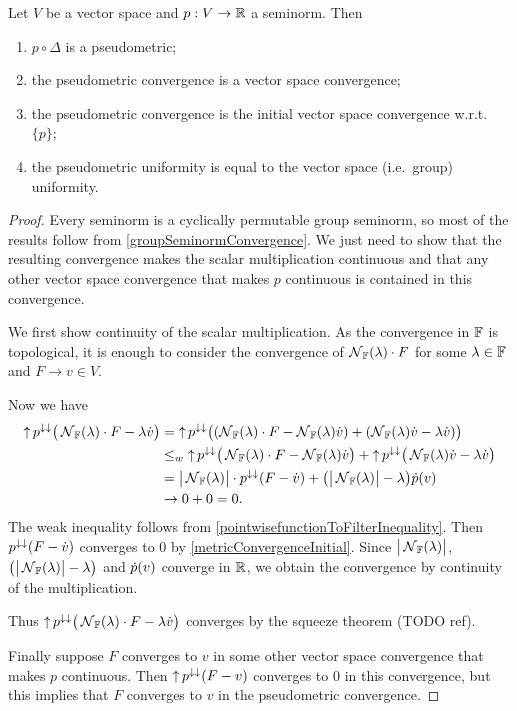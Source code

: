 \begin{lemma}
Let $V$ be a vector space and $p:V\to \mathbb{R}$ a seminorm. Then
\begin{enumerate}
\item $p\circ \Delta$ is a pseudometric;
\item the pseudometric convergence is a vector space convergence;
\item the pseudometric convergence is the initial vector space convergence w.r.t. $\{p\}$;
\item the pseudometric uniformity is equal to the vector space (i.e.\ group) uniformity.
\end{enumerate}
\end{lemma}
\begin{proof}
Every seminorm is a cyclically permutable group seminorm, so most of the results follow from \ref{groupSeminormConvergence}. We just need to show that the resulting convergence makes the scalar multiplication continuous and that any other vector space convergence that makes $p$ continuous is contained in this convergence.

We first show continuity of the scalar multiplication. As the convergence in $\mathbb{F}$ is topological, it is enough to consider the convergence of $\operatorname{\mathcal{N}}_{\mathbb{F}}(\lambda)\cdot F$ for some $\lambda \in \mathbb{F}$ and $F\to v\in V$. 

Now we have
\begin{align*}
\operatorname{\uparrow} p^{\downarrow\downarrow}\big(\operatorname{\mathcal{N}}_{\mathbb{F}}(\lambda)\cdot F - \lambda \dot{v}\big) &= \operatorname{\uparrow} p^{\downarrow\downarrow}\big((\operatorname{\mathcal{N}}_{\mathbb{F}}(\lambda)\cdot F - \operatorname{\mathcal{N}}_{\mathbb{F}}(\lambda)\dot{v}) + (\operatorname{\mathcal{N}}_{\mathbb{F}}(\lambda)\dot{v} -\lambda \dot{v})\big) \\
&\leq_w \operatorname{\uparrow} p^{\downarrow\downarrow}\big(\operatorname{\mathcal{N}}_{\mathbb{F}}(\lambda)\cdot F - \operatorname{\mathcal{N}}_{\mathbb{F}}(\lambda)\dot{v}\big) + \operatorname{\uparrow} p^{\downarrow\downarrow}\big(\operatorname{\mathcal{N}}_{\mathbb{F}}(\lambda)\dot{v} -\lambda \dot{v}\big) \\
&= \big|\operatorname{\mathcal{N}}_{\mathbb{F}}(\lambda)\big|\cdot p^{\downarrow\downarrow}(F-\dot{v}) + \big(\big|\operatorname{\mathcal{N}}_{\mathbb{F}}(\lambda)\big| - \lambda\big)\dot{p}(v) \\
&\to 0 + 0 = 0.
\end{align*}
The weak inequality follows from \ref{pointwisefunctionToFilterInequality}. Then $p^{\downarrow\downarrow}(F-\dot{v})$ converges to $0$ by \ref{metricConvergenceInitial}.
Since $\big|\operatorname{\mathcal{N}}_{\mathbb{F}}(\lambda)\big|$, $\big(\big|\operatorname{\mathcal{N}}_{\mathbb{F}}(\lambda)\big| - \lambda\big)$ and $\dot{p}(v)$ converge in $\mathbb{R}$, we obtain the convergence by continuity of the multiplication.

Thus $\operatorname{\uparrow} p^{\downarrow\downarrow}\big(\operatorname{\mathcal{N}}_{\mathbb{F}}(\lambda)\cdot F - \lambda \dot{v}\big)$ converges by the squeeze theorem (TODO ref).

Finally suppose $F$ converges to $v$ in some other vector space convergence that makes $p$ continuous. Then $\operatorname{\uparrow} p^{\downarrow\downarrow}(F-v)$ converges to $0$ in this convergence, but this implies that $F$ converges to $v$ in the pseudometric convergence.
\end{proof}

